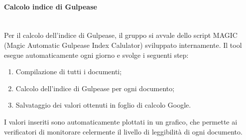 \paragraph{Calcolo indice di Gulpease}\mbox{}\\
Per il calcolo dell'indice di Gulpease, il gruppo \gruppo \space si avvale dello script MAGIC (Magic Automatic Gulpease Index Calulator) sviluppato internamente.
Il tool esegue automaticamente ogni giorno e svolge i seguenti step:
\begin{enumerate}
	\item Compilazione di tutti i documenti;
	\item Calcolo dell'indice di Gulpease per ogni documento;
	\item Salvataggio dei valori ottenuti in foglio di calcolo Google.
\end{enumerate}
I valori inseriti sono automaticamente plottati in un grafico, che permette ai verificatori di monitorare celermente il livello di leggibilità di ogni documento.

